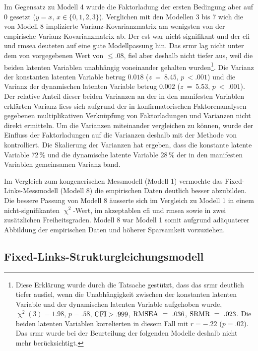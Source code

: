 \documentclass[11pt, twoside, a4paper]{book}		%
\begin{document}
Im Gegensatz zu Modell 4 wurde die Faktorladung der ersten Bedingung aber auf 0 gesetzt ($y=x,\,x\in\{0, 1, 2, 3\}$).
Verglichen mit den Modellen 3 bis 7 wich die von Modell 8 implizierte Var\-ianz-Ko\-var\-ianz\-ma\-trix am wenigsten von der empirische Var\-ianz-Ko\-var\-ianz\-ma\-trix ab. Der \gls{cst} war nicht signifikant und der \gls{cfi} und \gls{rmsea} deuteten auf eine gute Modellpassung hin. 
Das \gls{srmr}  lag nicht unter dem von \citet{Hu1999} vorgegebenen Wert von $\leq.08$, fiel aber deshalb  nicht tiefer aus, weil die beiden latenten Variablen unabhängig voneinander gehalten wurden\footnote{Diese Erklärung wurde durch die Tatsache gestützt, dass das \gls{srmr} deutlich tiefer ausfiel, wenn die Unabhängigkeit zwischen der konstanten latenten Variable und der dynamischen latenten Variable aufgehoben wurde, $\upchi^2(3)=1.98$, $p=.58$, $\textnormal{CFI}>.999$, $\textnormal{RMSEA}~=~.036$, $\textnormal{SRMR}~=~.023$. Die beiden latenten Variablen korrelierten in diesem Fall mit $r=-.22$ ($p=.02$). Das \gls{srmr} wurde bei der Beurteilung der folgenden Modelle deshalb nicht mehr berücksichtigt.}. 
Die Varianz der konstanten latenten Variable betrug $0.018$ ($z~=~8.45$, $p~<.001$) und die Varianz der dynamischen latenten Variable betrug $0.002$ ($z~=~5.53$, $p~<~.001$). 
Der relative Anteil dieser beiden Varianzen an der in den manifesten Variablen erklärten Varianz liess sich aufgrund der in konfirmatorischen Faktorenanalysen gegebenen multiplikativen Verknüpfung von Faktorladungen und Varianzen nicht direkt ermitteln. Um die Varianzen miteinander vergleichen zu können, wurde der Einfluss der Faktorladungen auf die Varianzen deshalb mit der Methode von  \citet{Schweizer2011a} kontrolliert. Die Skalierung der Varianzen hat ergeben, dass die konstante latente Variable 72\,\% und die dynamische latente Variable 28\,\% der in den manifesten Variablen gemeinsamen Varianz band.

Im Vergleich zum kongenerischen Messmodell (Modell 1) vermochte das Fixed-Links-Messmodell (Modell 8) die empirischen Daten deutlich besser abzubilden. Die bessere Passung von Modell 8 äusserte sich im Vergleich zu Modell 1 in einem nicht-signifikanten $\upchi^2$-Wert, im akzeptablen \gls{cfi} und \gls{rmsea} sowie in zwei zusätzlichen Freiheitsgraden. Modell 8 war Modell 1 somit aufgrund adäquaterer Abbildung der empirischen Daten und höherer Sparsamkeit vorzuziehen.



\subsection{Fixed-Links-Struk\-tur\-glei\-chungs\-mo\-dell}
\end{document}
